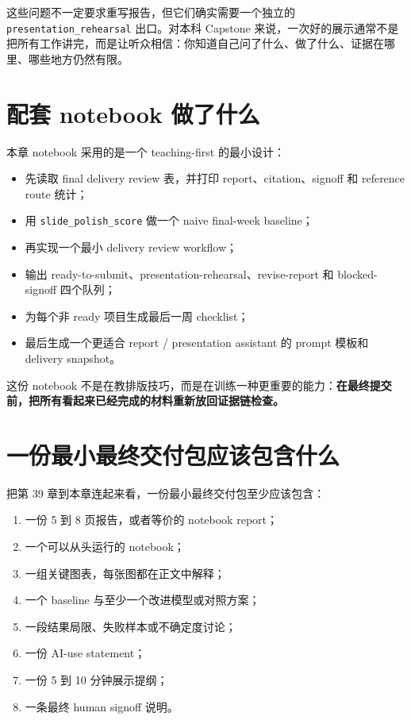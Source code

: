 这些问题不一定要求重写报告，但它们确实需要一个独立的 \texttt{presentation\_rehearsal} 出口。对本科 Capstone 来说，一次好的展示通常不是把所有工作讲完，而是让听众相信：你知道自己问了什么、做了什么、证据在哪里、哪些地方仍然有限。

\section{配套 notebook 做了什么}

本章 notebook 采用的是一个 teaching-first 的最小设计：

\begin{itemize}
    \item 先读取 final delivery review 表，并打印 report、citation、signoff 和 reference route 统计；
    \item 用 \texttt{slide\_polish\_score} 做一个 naive final-week baseline；
    \item 再实现一个最小 delivery review workflow；
    \item 输出 ready-to-submit、presentation-rehearsal、revise-report 和 blocked-signoff 四个队列；
    \item 为每个非 ready 项目生成最后一周 checklist；
    \item 最后生成一个更适合 report / presentation assistant 的 prompt 模板和 delivery snapshot。
\end{itemize}

这份 notebook 不是在教排版技巧，而是在训练一种更重要的能力：\textbf{在最终提交前，把所有看起来已经完成的材料重新放回证据链检查。}

\section{一份最小最终交付包应该包含什么}

把第 39 章到本章连起来看，一份最小最终交付包至少应该包含：

\begin{enumerate}
    \item 一份 5 到 8 页报告，或者等价的 notebook report；
    \item 一个可以从头运行的 notebook；
    \item 一组关键图表，每张图都在正文中解释；
    \item 一个 baseline 与至少一个改进模型或对照方案；
    \item 一段结果局限、失败样本或不确定度讨论；
    \item 一份 AI-use statement；
    \item 一份 5 到 10 分钟展示提纲；
    \item 一条最终 human signoff 说明。
\end{enumerate}

